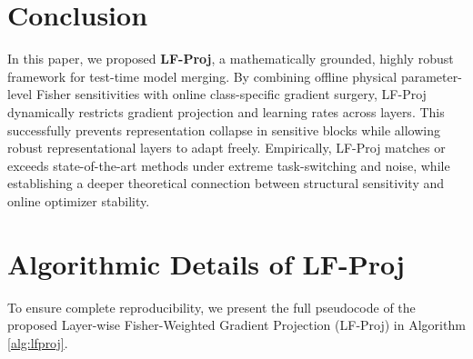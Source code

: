 \documentclass{article}
\theoremstyle{plain}
\theoremstyle{definition}
\theoremstyle{remark}
\begin{document}
\section{Conclusion}
In this paper, we proposed \textbf{LF-Proj}, a mathematically grounded, highly robust framework for test-time model merging. By combining offline physical parameter-level Fisher sensitivities with online class-specific gradient surgery, LF-Proj dynamically restricts gradient projection and learning rates across layers. This successfully prevents representation collapse in sensitive blocks while allowing robust representational layers to adapt freely. Empirically, LF-Proj matches or exceeds state-of-the-art methods under extreme task-switching and noise, while establishing a deeper theoretical connection between structural sensitivity and online optimizer stability.




\newpage
\appendix
\onecolumn

\section{Algorithmic Details of LF-Proj}
To ensure complete reproducibility, we present the full pseudocode of the proposed Layer-wise Fisher-Weighted Gradient Projection (LF-Proj) in Algorithm \ref{alg:lfproj}.
\end{document}
